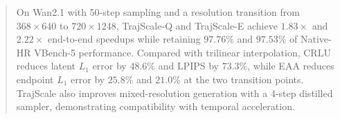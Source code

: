 \documentclass[letterpaper]{article} %
\begin{document}
\begin{abstract}
On Wan2.1 with 50-step sampling and a resolution transition from \(368\times640\) to \(720\times1248\), TrajScale-Q and TrajScale-E achieve \(1.83\times\) and \(2.22\times\) end-to-end speedups while retaining \(97.76\%\) and \(97.53\%\) of Native-HR VBench-5 performance. Compared with trilinear interpolation, CRLU reduces latent \(L_1\) error by \(48.6\%\) and LPIPS by \(73.3\%\), while EAA reduces endpoint \(L_1\) error by \(25.8\%\) and \(21.0\%\) at the two transition points. TrajScale also improves mixed-resolution generation with a 4-step distilled sampler, demonstrating compatibility with temporal acceleration.
\end{abstract}




\end{document}
